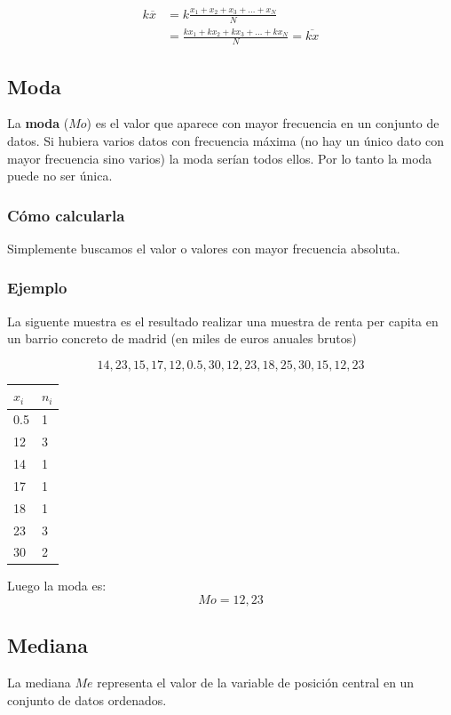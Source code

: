 \documentclass[
]{article}
\begin{document}
\begin{align*}
k \overline{x} &= k\frac{x_1+ x_2  + x_3  +\ldots  + x_N }{N}\\
&=\frac{k x_1+ k x_2 + k x_3  +\ldots  + k x_N}{N} = \overline {kx}
\end{align*}

\hypertarget{moda}{%
\subsection{Moda}\label{moda}}

La \textbf{moda} (\(Mo\)) es el valor que aparece con mayor frecuencia
en un conjunto de datos. Si hubiera varios datos con frecuencia máxima
(no hay un único dato con mayor frecuencia sino varios) la moda serían
todos ellos. Por lo tanto la moda puede no ser única.

\hypertarget{cuxf3mo-calcularla-1}{%
\subsubsection{Cómo calcularla}\label{cuxf3mo-calcularla-1}}

Simplemente buscamos el valor o valores con mayor frecuencia absoluta.

\hypertarget{ejemplo-2}{%
\subsubsection{Ejemplo}\label{ejemplo-2}}

La siguente muestra es el resultado realizar una muestra de renta per
capita en un barrio concreto de madrid (en miles de euros anuales
brutos)

\[ 14, 23, 15, 17,12, 0.5, 30, 12, 23, 18, 25, 30, 15, 12, 23 \]

\begin{longtable}[]{@{}ll@{}}
\toprule
\(x_i\) & \(n_i\)\tabularnewline
\midrule
\endhead
0.5 & 1\tabularnewline
12 & 3\tabularnewline
14 & 1\tabularnewline
17 & 1\tabularnewline
18 & 1\tabularnewline
23 & 3\tabularnewline
30 & 2\tabularnewline
\bottomrule
\end{longtable}

Luego la moda es: \[Mo = 12, 23\]

\hypertarget{mediana}{%
\subsection{Mediana}\label{mediana}}

La mediana \(Me\) representa el valor de la variable de posición central
en un conjunto de datos ordenados.
\end{document}
